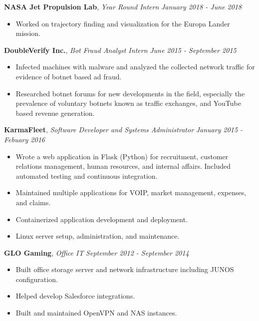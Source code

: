 \documentclass[9pt]{article}
\newenvironment{changemargin}[2]{%
  \begin{list}{}{%
    \setlength{\topsep}{0pt}%
    \setlength{\leftmargin}{#1}%
    \setlength{\rightmargin}{#2}%
    \setlength{\listparindent}{\parindent}%
    \setlength{\itemindent}{\parindent}%
    \setlength{\parsep}{\parskip}%
  }%
  \item[]}{\end{list}
}
\newenvironment{body} {
	\vspace*{-16pt}
	\begin{changemargin}{-0.25in}{-0.5in}
  }	
	{\end{changemargin}
}
\begin{document}
\begin{body}
	\textbf{NASA Jet Propulsion Lab}, \emph{Year Round Intern} \hfill \emph{January 2018 - June 2018}\\
	\vspace*{-3pt}
	\begin{itemize} \itemsep -0pt %
		\item Worked on trajectory finding and visualization for the Europa Lander mission.
	\end{itemize}
	\vspace*{-2pt}

	\textbf{DoubleVerify Inc.}, \emph{Bot Fraud Analyst Intern} \hfill \emph{June 2015 - September 2015}\\
	\vspace*{-3pt}
	\begin{itemize} \itemsep -0pt %
		\item Infected machines with malware and analyzed the collected network traffic for evidence of botnet based ad fraud.
		\item Researched botnet forums for new developments in the field, especially the prevalence of voluntary botnets known as traffic exchanges, and YouTube based revenue generation.
	\end{itemize}
	\vspace*{-2pt}

	\textbf{KarmaFleet}, \emph{Software Developer and Systems Administrator} \hfill \emph{January 2015 - Febuary 2016}\\
	\vspace*{-3pt}
	\begin{itemize} \itemsep -0pt %
		\item Wrote a web application in Flask (Python) for recruitment, customer relations management, human resources, and internal affairs. Included automated testing and continuous integration.
		\item Maintained multiple applications for VOIP, market management, expenses, and claims.
		\item Containerized application development and deployment.
		\item Linux server setup, administration, and maintenance.
	\end{itemize}
	\vspace*{-2pt}

	\textbf{GLO Gaming}, \emph{Office IT} \hfill \emph{September 2012 - September 2014}\\
	\vspace*{-3pt}
	\begin{itemize} \itemsep -0pt %
		\item Built office storage server and network infrastructure including JUNOS configuration.
		\item Helped develop Salesforce integrations.
		\item Built and maintained OpenVPN and NAS instances.
	\end{itemize}
	\vspace*{-2pt}


\end{body}
\end{document}

